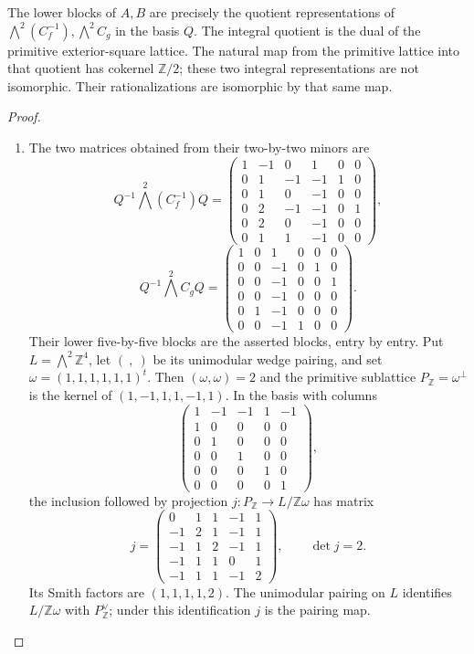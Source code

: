 \begin{theorem}\hypertarget{tag-02QT}{}\label{night:P1.2}
The lower blocks of $A,B$ are precisely the quotient representations of
$\bigwedge^2(C_f^{-1}),\bigwedge^2C_g$ in the basis $Q$.
The integral quotient is the dual of the primitive exterior-square
lattice.  The natural map from the primitive lattice into that quotient
has cokernel $\mathbb Z/2$; these two integral representations are not
isomorphic.  Their rationalizations are isomorphic by that same map.
\end{theorem}
\begin{proof}
\begin{enumerate}[label={$\langle1\rangle$\arabic*.}]
\item The two matrices obtained from their two-by-two minors are
\[
Q^{-1}\bigwedge^2(C_f^{-1})Q=
\begin{pmatrix}
1&-1&0&1&0&0\\0&1&-1&-1&1&0\\0&1&0&-1&0&0\\
0&2&-1&-1&0&1\\0&2&0&-1&0&0\\0&1&1&-1&0&0
\end{pmatrix},
\]
\[
Q^{-1}\bigwedge^2C_gQ=
\begin{pmatrix}
1&0&1&0&0&0\\0&0&-1&0&1&0\\0&0&-1&0&0&1\\
0&0&-1&0&0&0\\0&1&-1&0&0&0\\0&0&-1&1&0&0
\end{pmatrix}.
\]
Their lower five-by-five blocks are the asserted blocks, entry by entry.
Put $L=\bigwedge^2\mathbb Z^4$, let $(\ ,\ )$ be its unimodular wedge
pairing, and set $\omega=(1,1,1,1,1,1)^t$.
Then $(\omega,\omega)=2$ and the primitive sublattice
$P_{\mathbb Z}=\omega^\perp$ is the kernel of
$(1,-1,1,1,-1,1)$.  In the basis with columns
\[
\begin{pmatrix}
1&-1&-1&1&-1\\1&0&0&0&0\\0&1&0&0&0\\
0&0&1&0&0\\0&0&0&1&0\\0&0&0&0&1
\end{pmatrix},
\]
the inclusion followed by projection
$j:P_{\mathbb Z}\longrightarrow L/\mathbb Z\omega$ has matrix
\[
j=\begin{pmatrix}
0&1&1&-1&1\\-1&2&1&-1&1\\-1&1&2&-1&1\\
-1&1&1&0&1\\-1&1&1&-1&2
\end{pmatrix},\qquad \det j=2.
\]
Its Smith factors are $(1,1,1,1,2)$.  The unimodular pairing on $L$
identifies $L/\mathbb Z\omega$ with $P_{\mathbb Z}^\vee$;
under this identification $j$ is the pairing map.


\end{enumerate}
\end{proof}
